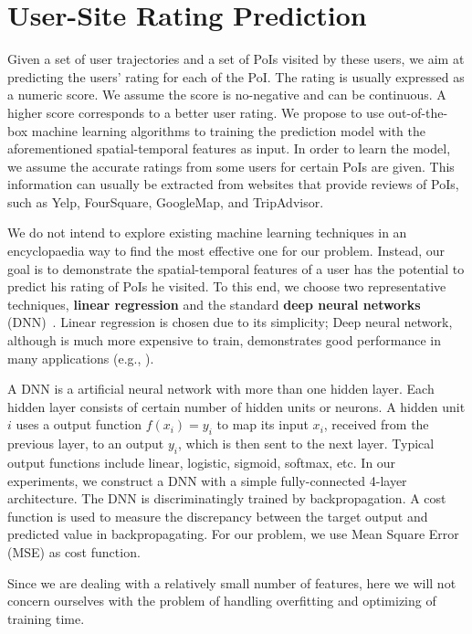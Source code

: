 \section{User-Site Rating Prediction}
\label{sec:prediction}

Given a set of user trajectories and a set of PoIs visited by these users, we aim at predicting the users' rating for each of the PoI. The rating is usually expressed as a numeric score. We assume the score is no-negative and can be continuous. A higher score corresponds to a better user rating. We propose to use out-of-the-box machine learning algorithms to training the prediction model with the aforementioned spatial-temporal features as input. In order to learn the model, we assume the accurate ratings from some users for certain PoIs are given. This information can usually be extracted from websites that provide reviews of PoIs, such as Yelp, FourSquare, GoogleMap, and TripAdvisor. 

We do not intend to explore existing machine learning techniques in an encyclopaedia way to find the most effective one for our problem. Instead, our goal is to demonstrate the spatial-temporal features of a user has the potential to predict his rating of PoIs he visited. To this end, we choose two representative techniques, \textbf{linear regression} and the standard \textbf{deep neural networks} (DNN)~\cite{schmidhuber2015deep}. Linear regression is chosen due to its simplicity; Deep neural network, although is much more expensive to train, demonstrates good performance in many applications (e.g., \cite{ruiz2013innovative, hinton2012deep, krizhevsky2012imagenet}).

A DNN is a artificial neural network with more than one hidden layer. Each hidden layer consists of certain number of hidden units or neurons. A hidden unit $i$ uses a output function $f(x_i) = y_i$ to map its input $x_i$, received from the previous layer, to an output $y_i$, which is then sent to the next layer. Typical output functions include linear, logistic, sigmoid, softmax, etc. In our experiments, we construct a DNN with a simple fully-connected 4-layer architecture. The DNN is discriminatingly trained by backpropagation. A cost function is used to measure the discrepancy between the target output and predicted value in backpropagating. For our problem, we use Mean Square Error (MSE) as cost function. 

Since we are dealing with a relatively small number of features, here we will not concern ourselves with the problem of handling overfitting and optimizing of training time.
